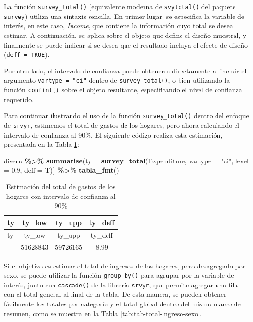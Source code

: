 \documentclass[
  spanish,
  12pt,
]{book}
\newenvironment{Shaded}{\begin{snugshade}}{\end{snugshade}}
\newcommand{\AttributeTok}[1]{\textcolor[rgb]{0.13,0.29,0.53}{#1}}
\newcommand{\FloatTok}[1]{\textcolor[rgb]{0.00,0.00,0.81}{#1}}
\newcommand{\FunctionTok}[1]{\textcolor[rgb]{0.13,0.29,0.53}{\textbf{#1}}}
\newcommand{\NormalTok}[1]{#1}
\newcommand{\SpecialCharTok}[1]{\textcolor[rgb]{0.81,0.36,0.00}{\textbf{#1}}}
\newcommand{\StringTok}[1]{\textcolor[rgb]{0.31,0.60,0.02}{#1}}
\begin{document}
La función \texttt{survey\_total()} (equivalente moderna de \texttt{svytotal()} del paquete \texttt{survey}) utiliza una sintaxis sencilla. En primer lugar, se especifica la variable de interés, en este caso, \emph{Income}, que contiene la información cuyo total se desea estimar. A continuación, se aplica sobre el objeto que define el diseño muestral, y finalmente se puede indicar si se desea que el resultado incluya el efecto de diseño (\texttt{deff\ =\ TRUE}).

Por otro lado, el intervalo de confianza puede obtenerse directamente al incluir el argumento \texttt{vartype\ =\ "ci"} dentro de \texttt{survey\_total()}, o bien utilizando la función \texttt{confint()} sobre el objeto resultante, especificando el nivel de confianza requerido.

Para continuar ilustrando el uso de la función \texttt{survey\_total()} dentro del enfoque de \texttt{srvyr}, estimemos el total de gastos de los hogares, pero ahora calculando el intervalo de confianza al 90\%. El siguiente código realiza esta estimación, presentada en la Tabla \ref{tab:tab-total-gasto}:

\begin{Shaded}
\begin{Highlighting}[]
\NormalTok{diseno }\SpecialCharTok{\%\textgreater{}\%}
  \FunctionTok{summarise}\NormalTok{(}\AttributeTok{ty =} \FunctionTok{survey\_total}\NormalTok{(Expenditure, }
                              \AttributeTok{vartype =} \StringTok{"ci"}\NormalTok{, }\AttributeTok{level =} \FloatTok{0.9}\NormalTok{, }
                              \AttributeTok{deff =}\NormalTok{ T)) }\SpecialCharTok{\%\textgreater{}\%}
  \FunctionTok{tabla\_fmt}\NormalTok{()}
\end{Highlighting}
\end{Shaded}

\begin{longtable}[]{@{}lccc@{}}
\caption{\label{tab:tab-total-gasto}Estimación del total de gastos de los hogares con intervalo de confianza al 90\%}\tabularnewline
\toprule\noalign{}
ty & ty\_low & ty\_upp & ty\_deff \\
\midrule\noalign{}
\endfirsthead
\toprule\noalign{}
ty & ty\_low & ty\_upp & ty\_deff \\
\midrule\noalign{}
\endhead
\bottomrule\noalign{}
\endlastfoot
55677504 & 51628843 & 59726165 & 8.99 \\
\end{longtable}

Si el objetivo es estimar el total de ingresos de los hogares, pero desagregado por sexo, se puede utilizar la función \texttt{group\_by()} para agrupar por la variable de interés, junto con \texttt{cascade()} de la librería \texttt{srvyr}, que permite agregar una fila con el total general al final de la tabla. De esta manera, se pueden obtener fácilmente los totales por categoría y el total global dentro del mismo marco de resumen, como se muestra en la Tabla \ref{tab:tab-total-ingreso-sexo}.
\end{document}
